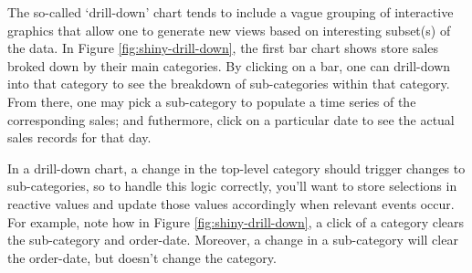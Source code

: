 \documentclass[
  12pt,
]{krantz}
\begin{document}
The so-called `drill-down' chart tends to include a vague grouping of interactive graphics that allow one to generate new views based on interesting subset(s) of the data. In Figure \ref{fig:shiny-drill-down}, the first bar chart shows store sales broked down by their main categories. By clicking on a bar, one can drill-down into that category to see the breakdown of sub-categories within that category. From there, one may pick a sub-category to populate a time series of the corresponding sales; and futhermore, click on a particular date to see the actual sales records for that day.

In a drill-down chart, a change in the top-level category should trigger changes to sub-categories, so to handle this logic correctly, you'll want to store selections in reactive values and update those values accordingly when relevant events occur. For example, note how in Figure \ref{fig:shiny-drill-down}, a click of a category clears the sub-category and order-date. Moreover, a change in a sub-category will clear the order-date, but doesn't change the category.
\end{document}
